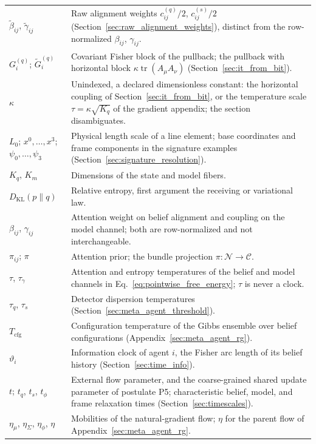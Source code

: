 {\begin{longtable}{@{}p{}p{}@{}}
$\tilde\beta_{ij}$, $\tilde\gamma_{ij}$ & Raw alignment weights $c^{(q)}_{ij}/2$, $c^{(s)}_{ij}/2$ (Section~\ref{sec:raw_alignment_weights}), distinct from the row-normalized $\beta_{ij}$, $\gamma_{ij}$. \\
$G^{(q)}_i$; $\widetilde{G}^{(q)}_i$ & Covariant Fisher block of the pullback; the pullback with horizontal block $\kappa\operatorname{tr}(A_\mu A_\nu)$ (Section~\ref{sec:it_from_bit}). \\
$\kappa$ & Unindexed, a declared dimensionless constant: the horizontal coupling of Section~\ref{sec:it_from_bit}, or the temperature scale $\tau=\kappa\sqrt{K_q}$ of the gradient appendix; the section disambiguates. \\
$L_0$; $x^0,\ldots,x^3$; $\psi_0,\ldots,\psi_3$ & Physical length scale of a line element; base coordinates and frame components in the signature examples (Section~\ref{sec:signature_resolution}). \\
$K_q$, $K_m$ & Dimensions of the state and model fibers. \\
$D_{\mathrm{KL}}(p\|q)$ & Relative entropy, first argument the receiving or variational law. \\
$\beta_{ij}$, $\gamma_{ij}$ & Attention weight on belief alignment and coupling on the model channel; both are row-normalized and not interchangeable. \\
$\pi_{ij}$; $\pi$ & Attention prior; the bundle projection $\pi:\mathcal{N}\to\mathcal{C}$. \\
$\tau$, $\tau_\gamma$ & Attention and entropy temperatures of the belief and model channels in Eq.~\eqref{eq:pointwise_free_energy}; $\tau$ is never a clock. \\
$\tau_q$, $\tau_s$ & Detector dispersion temperatures (Section~\ref{sec:meta_agent_threshold}). \\
$T_{\mathrm{cfg}}$ & Configuration temperature of the Gibbs ensemble over belief configurations (Appendix~\ref{sec:meta_agent_rg}). \\
$\vartheta_i$ & Information clock of agent $i$, the Fisher arc length of its belief history (Section~\ref{sec:time_info}). \\
$t$; $t_q$, $t_s$, $t_\phi$ & External flow parameter, and the coarse-grained shared update parameter of postulate P5; characteristic belief, model, and frame relaxation times (Section~\ref{sec:timescales}). \\
$\eta_\mu$, $\eta_\Sigma$, $\eta_\phi$, $\eta$ & Mobilities of the natural-gradient flow; $\eta$ for the parent flow of Appendix~\ref{sec:meta_agent_rg}. \\

\end{longtable}}

